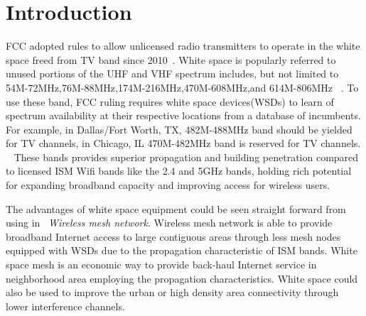 \section{Introduction}
\label{sec:introduction}

FCC adopted rules to allow unlicensed radio transmitters to operate in the white space freed from TV band since 2010~\cite{fccwhitespace}. 
White space is popularly referred to unused portions of the UHF and VHF spectrum includes, but not limited to 54M-72MHz,76M-88MHz,174M-216MHz,470M-608MHz,and 614M-806MHz ~\cite{whitespacewiki}.
To use these band, FCC ruling requires white space devices(WSDs) to learn of spectrum availability at their respective locations from a database of incumbents. 
For example, in Dallas/Fort Worth, TX, 482M-488MHz band should be yielded for TV channels, in Chicago, IL 470M-482MHz band is reserved for TV channels. ~\cite{broadband}
 These bands provides superior propagation and building penetration compared to licensed ISM Wifi bands like the 2.4 and 5GHz bands, holding rich potential for expanding broadband capacity and improving access for wireless users.


The advantages of white space equipment could be seen straight forward from using in ~\emph{Wireless mesh network}.
Wireless mesh network is able to provide broadband Internet access to large contiguous areas through less mesh nodes equipped with WSDs due to the propagation characteristic of ISM bands. 
White space mesh is an economic way to provide back-haul Internet service in neighborhood area employing the propagation characteristics.
White space could also be used to improve the urban or high density area connectivity through lower interference channels. 

